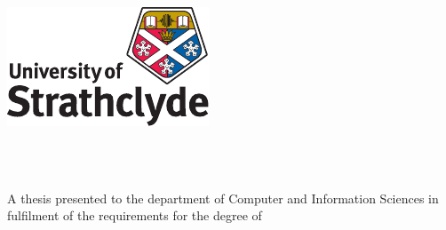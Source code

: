 \begin{titlepage}
    \begin{center}
        \large  

        \hfill

        \vfill
		\includegraphics[width=6cm]{gfx/logo} \\ \medskip
		 \vfill
        \begingroup
            \huge\color{Maroon}\spacedallcaps{\myTitle} \\ 
            \bigskip
        \endgroup

        

        

        
\vfill
\LARGE\spacedlowsmallcaps{\myName} \\\bigskip
       
        \normalsize A thesis presented to the department of Computer and Information Sciences 
        in fulfilment of the requirements for the degree of \myDegree \\

        \myTime

        \vfill                      

    \end{center}  
\end{titlepage}   